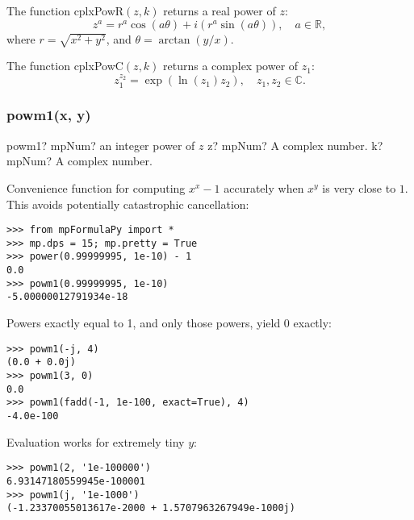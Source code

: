 \vspace{0.3cm}
The function \textsf{cplxPowR$(z, k)$} returns a real power of $z$: 
\begin{equation}
	z^a = r^a \cos(a \theta) + i(r^a \sin(a \theta)), \quad  a \in  \mathbb{R},
\end{equation}
where $r=\sqrt{x^2+y^2}$, and $\theta=\arctan(y/x)$.



\vspace{0.3cm}
The function \textsf{cplxPowC$(z, k)$} returns a complex power of $z_1$: 
\begin{equation}
	z_1^{z_2} = \exp(\ln(z_1) z_2) , \quad  z_1, z_2 \in  \mathbb{C}.
\end{equation}


\subsubsection{powm1(x, y)}


\begin{mpFunctionsExtract}
	\mpFunctionTwo
	{powm1? mpNum? an integer power of $z$}
	{z? mpNum? A complex number.}
	{k? mpNum?  A complex number.}
\end{mpFunctionsExtract}


Convenience function for computing $x^{x}-1$ accurately when $x^y$ is very close to $1$. This avoids potentially catastrophic cancellation:

\begin{lstlisting}
>>> from mpFormulaPy import *
>>> mp.dps = 15; mp.pretty = True
>>> power(0.99999995, 1e-10) - 1
0.0
>>> powm1(0.99999995, 1e-10)
-5.00000012791934e-18
\end{lstlisting}


Powers exactly equal to 1, and only those powers, yield 0 exactly:
\begin{lstlisting}
>>> powm1(-j, 4)
(0.0 + 0.0j)
>>> powm1(3, 0)
0.0
>>> powm1(fadd(-1, 1e-100, exact=True), 4)
-4.0e-100
\end{lstlisting}


Evaluation works for extremely tiny $y$:
\begin{lstlisting}
>>> powm1(2, '1e-100000')
6.93147180559945e-100001
>>> powm1(j, '1e-1000')
(-1.23370055013617e-2000 + 1.5707963267949e-1000j)
\end{lstlisting}





